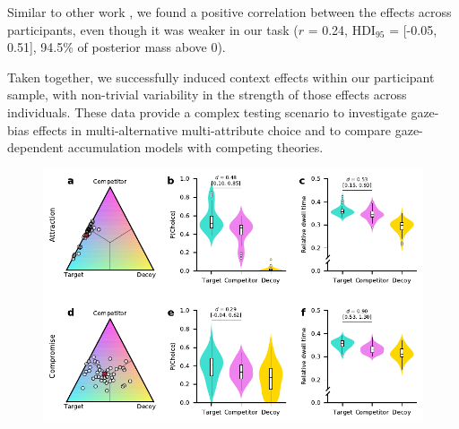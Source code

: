 \documentclass[11pt, a4paper]{article}
\begin{document}
Similar to other work \parencite{berkowitsch2014RigorouslyTestingMultialternative,trueblood2014MultiattributeLinearBallistic}, we found a positive correlation between the effects across participants, even though it was weaker in our task ($r$ = 0.24, HDI$_{95}$ = [-0.05, 0.51], 94.5\% of posterior mass above 0). 

Taken together, we successfully induced context effects within our participant sample, with non-trivial variability in the strength of those effects across individuals. These data provide a complex testing scenario to investigate gaze-bias effects in multi-alternative multi-attribute choice and to compare gaze-dependent accumulation models with competing theories.

\begin{figure}[bt!]
\begin{centering}
\includegraphics[scale=1]{../figures/2-context-effects.pdf}

\end{centering}
\end{figure}
\end{document}
